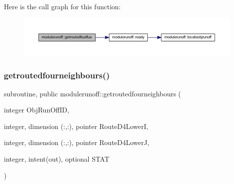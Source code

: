 Here is the call graph for this function\+:
\nopagebreak
\begin{figure}[H]
\begin{center}
\leavevmode
\includegraphics[width=350pt]{namespacemodulerunoff_a8e2e0bbd121e81c889fd2cd186c45b5c_cgraph}
\end{center}
\end{figure}
\mbox{\label{namespacemodulerunoff_a012d41440fbbe25a6de0417a150502fd}} 
\subsubsection{\texorpdfstring{getroutedfourneighbours()}{getroutedfourneighbours()}}
{\footnotesize\ttfamily subroutine, public modulerunoff\+::getroutedfourneighbours (\begin{DoxyParamCaption}\item[{integer}]{Obj\+Run\+Off\+ID,  }\item[{integer, dimension (\+:,\+:), pointer}]{Route\+D4\+LowerI,  }\item[{integer, dimension (\+:,\+:), pointer}]{Route\+D4\+LowerJ,  }\item[{integer, intent(out), optional}]{S\+T\+AT }\end{DoxyParamCaption})}

